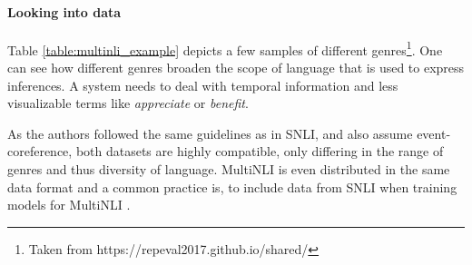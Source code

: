\paragraph*{Looking into data}
Table \ref{table:multinli_example} depicts a few samples of different genres\footnote{Taken from https://repeval2017.github.io/shared/}. One can see how different genres broaden the scope of language that is used to express inferences. A system needs to deal with temporal information and less visualizable terms like \textit{appreciate} or \textit{benefit}.
\begin{center}
\begin{table}[h]
\begin{center}
\end{center}
\caption{Example sentence pairs from \ac{MultiNLI}, taken from RepEval 2017 Shared Task, showing samples of different genres.}
\label{table:multinli_example}
\end{table}
\end{center}
As the authors followed the same guidelines as in \ac{SNLI}, and also assume event-coreference, both datasets are highly compatible, only differing in the range of genres and thus diversity of language. \ac{MultiNLI} is even distributed in the same data format and a common practice is, to include data from \ac{SNLI} when training models for \ac{MultiNLI} \citep{nie2017shortcut,balazs2017refining,yang2017character}.

